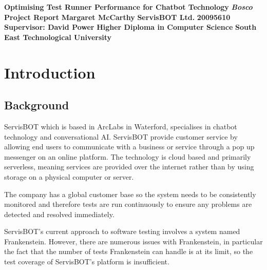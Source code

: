 \documentclass[12pt,a4paper,titlepage]{report}
\newcommand\AcademicTitle{Optimising Test Runner Performance for Chatbot Technology}
\newcommand\CommercialTitle{Bosco}
\newcommand\Author{Margaret McCarthy}
\newcommand\StudentID{20095610}
\newcommand\Report{Project Report}
\newcommand\Stakeholder{ServisBOT Ltd.}
\newcommand\Course{Higher Diploma in Computer Science}
\newcommand\Reader{Supervisor: David Power}
\newcommand\University{South East Technological University}
\begin{document}

\thispagestyle{empty}
\begin{center}
 \mbox{}\vfill
 {\fontsize{17pt}{20pt}\selectfont \bfseries \AcademicTitle}
 \vfill
 {\fontsize{14pt}{20pt}\selectfont \bfseries\itshape \CommercialTitle}
 \vfill
 {\fontsize{12pt}{20pt}\selectfont \bfseries \Report}
 \vfill
 {\fontsize{14pt}{20pt}\selectfont \bfseries \Author}
 \vfill
 {\fontsize{14pt}{20pt}\selectfont \bfseries \Stakeholder}
 \vfill
 {\fontsize{14pt}{20pt}\selectfont \bfseries \StudentID}
 \vfill
 {\fontsize{14pt}{20pt}\selectfont \bfseries \Reader}
 \vfill
 {\fontsize{14pt}{20pt}\selectfont \bfseries \Course}
 \vfill
 {\fontsize{14pt}{20pt}\selectfont \bfseries \University}
 \vfill
\end{center}
\clearpage

\tableofcontents
{}
\listoftables
{}
\listoffigures
\clearpage
{}


\clearpage
{}
\setcounter{page}{1}

\chapter{Introduction}

\section{Background}

ServisBOT which is based in ArcLabs in Waterford, specialises in chatbot technology and
conversational AI. ServisBOT provide customer service by allowing end users to
communicate with a business or service through a pop up messenger on an online platform.
The technology is cloud based and primarily serverless, meaning services are provided over
the internet rather than by using storage on a physical computer or server. 

The company has a global customer base so the system needs to be consistently monitored and therefore
tests are run continuously to ensure any problems are detected and resolved immediately.

ServisBOT's current approach to software testing involves a system named Frankenstein. 
However, there are numerous issues with Frankenstein, in particular the fact that the number of tests Frankenstein can handle is at its limit, so the test coverage of ServisBOT's platform is insufficient. 
\end{document}
